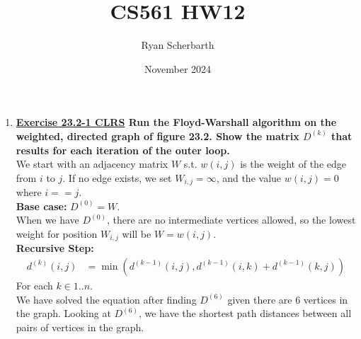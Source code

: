 \documentclass{article}
\title{CS561 HW12}
\author{Ryan Scherbarth}
\date{November 2024}
\begin{document}
\maketitle

\begin{enumerate}

\item \textbf{ \underline{Exercise 23.2-1 CLRS} Run the Floyd-Warshall algorithm on the weighted, directed graph of figure 23.2. Show the matrix $D^{(k)}$ that results for each iteration of the outer loop. } \\

We start with an adjacency matrix $W$ s.t. $w(i,j)$ is the weight of the edge from $i$ to $j$. If no edge exists, we set $W_{i, j} = \infty$, and the value $w(i, j) = 0$ where $i == j$. \\
\newline 
\textbf{Base case: } $D^{(0)} = W$. \\
When we have $D^{(0)}$, there are no intermediate vertices allowed, so the lowest weight for position $W_{i,j}$ will be $W = w(i,j)$. \\
\newline 
\textbf{Recursive Step:}
\begin{align*}
    d^{(k)}(i,j) & = \min(d^{(k-1)}(i,j), d^{(k-1)}(i,k)+d^{(k-1)}(k,j))
\end{align*}
For each $k \in 1..n$. \\
\newline 
We have solved the equation after finding $D^{(6)}$ given there are 6 vertices in the graph. Looking at $D^{(6)}$, we have the shortest path distances between all pairs of vertices in the graph. 


\end{enumerate}
\end{document}
